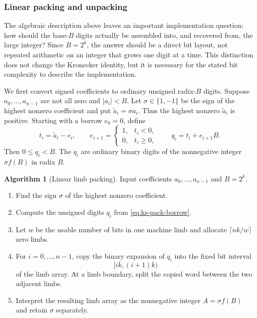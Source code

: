 \documentclass[11pt]{book}
\theoremstyle{definition}
\newtheorem{algorithm}[theorem]{Algorithm}
\begin{document}
\subsubsection{Linear packing and unpacking}

The algebraic description above leaves an important implementation question:
how should the base-$B$ digits actually be assembled into, and recovered from,
the large integer?  Since $B=2^k$, the answer should be a direct bit layout,
not repeated arithmetic on an integer that grows one digit at a time.  This
distinction does not change the Kronecker identity, but it is necessary for the
stated bit complexity to describe the implementation.

We first convert signed coefficients to ordinary unsigned radix-$B$ digits.
Suppose $a_0,\ldots,a_{n-1}$ are not all zero and $|a_i|<B$.  Let
$\sigma\in\{1,-1\}$ be the sign of the highest nonzero coefficient and put
$\widetilde a_i=\sigma a_i$.  Thus the highest nonzero
$\widetilde a_i$ is positive.  Starting with a borrow $e_0=0$, define
\begin{equation}\label{eq:ks-pack-borrow}
 t_i=\widetilde a_i-e_i,\qquad
 e_{i+1}=\begin{cases}1,&t_i<0,\\0,&t_i\geq0,\end{cases}
 \qquad
 q_i=t_i+e_{i+1}B.
\end{equation}
Then $0\leq q_i<B$.  The $q_i$ are ordinary binary digits of the nonnegative
integer $\sigma f(B)$ in radix $B$.

\begin{algorithm}[Linear limb packing]\label{alg:ks-linear-pack}
Input coefficients $a_0,\ldots,a_{n-1}$ and $B=2^k$.
\begin{enumerate}
 \item Find the sign $\sigma$ of the highest nonzero coefficient.
 \item Compute the unsigned digits $q_i$ from
       \eqref{eq:ks-pack-borrow}.
 \item Let $w$ be the usable number of bits in one machine limb and allocate
       $\lceil nk/w\rceil$ zero limbs.
 \item For $i=0,\ldots,n-1$, copy the binary expansion of $q_i$ into the
       fixed bit interval
       \[
          [ik,(i+1)k)
       \]
       of the limb array.  At a limb boundary, split the copied word between
       the two adjacent limbs.
 \item Interpret the resulting limb array as the nonnegative integer
       $A=\sigma f(B)$ and retain $\sigma$ separately.
\end{enumerate}
\end{algorithm}
\end{document}
